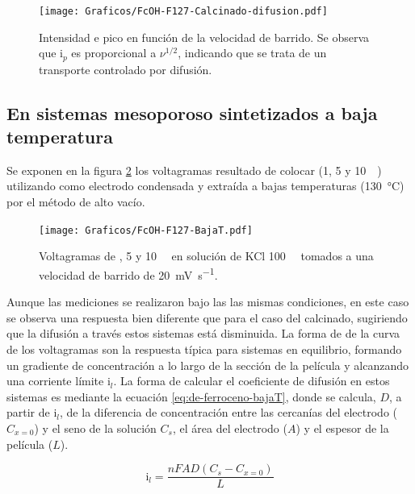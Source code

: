 		    \begin{figure}[ht]
				\centering
		 	    \texttt{[image: Graficos/FcOH-F127-Calcinado-difusion.pdf]}
		        \caption[i$_p$ en función de $\nu$ para \fc\space]{Intensidad e pico en función de la velocidad de barrido. Se observa que $\text{i}_p$ es proporcional a $\nu ^{1/2}$, indicando que se trata de un transporte controlado por difusión.}
		        \label{fig:difusion_calcinado}
		      	\end{figure}
	      	
	\subsection{En sistemas mesoporoso sintetizados a baja temperatura}

		Se exponen en la figura \ref{fig:fcoh_bajaT} los voltagramas resultado de colocar \fc\space (1, 5 y \SI{10}{\milli\Molar}) utilizando como electrodo \pdmF\space condensada y extraída a bajas temperaturas (\SI{130}{\celsius}) por el método de alto vacío. 
			\begin{figure}[ht]
				\centering
		 	    \texttt{[image: Graficos/FcOH-F127-BajaT.pdf]}
		        \caption[Voltagrama para \fc\space en \pdm\space de baja temperatura]{Voltagramas de \fc{}, 5 y \SI{10}{\milli\Molar} en solución de KCl \SI{100}{\milli\Molar} tomados a una velocidad de barrido de \SI{20}{\milli\volt\per\second}.}
		        \label{fig:fcoh_bajaT}
		      	\end{figure}
		
		Aunque las mediciones se realizaron bajo las las mismas condiciones, en este caso se observa una respuesta bien diferente que para el caso del calcinado, sugiriendo que la difusión a través estos sistemas está disminuida. La forma de de la curva de los voltagramas son la respuesta típica para sistemas en equilibrio, formando un gradiente de concentración a lo largo de la sección de la película y alcanzando una corriente límite $\text{i}_l$. 
		La forma de calcular el coeficiente de difusión en estos sistemas es mediante la ecuación \ref{eq:de-ferroceno-bajaT}, donde se calcula, $D$, a partir de $\text{i}_l$, de la diferencia de concentración entre las cercanías del electrodo ($C_{x=0}$) y el seno de la solución $C_s$, el área del electrodo ($A$) y el espesor de la película ($L$).

			\begin{equation}
					\text{i}_l = \frac{nFAD(C_{s}-C_{x=0})}{L}
					\label{eq:de-ferroceno-bajaT}
			\end{equation}
			  	

